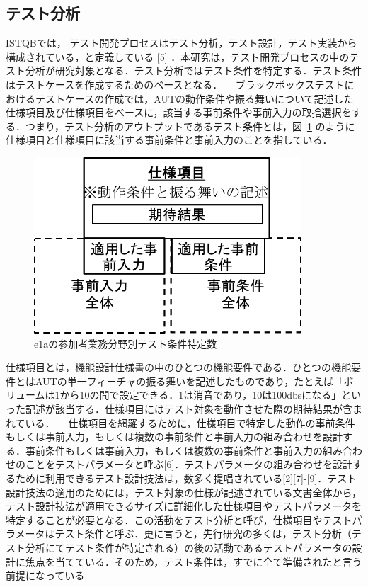 \documentclass[a4paper,12pt]{jreport}
\begin{document}
\subsection{テスト分析}
ISTQBでは， テスト開発プロセスはテスト分析，テスト設計，テスト実装から構成されている，と定義している [5] ．本研究は，テスト開発プロセスの中のテスト分析が研究対象となる．テスト分析ではテスト条件を特定する．テスト条件はテストケースを作成するためのベースとなる．
　ブラックボックステストにおけるテストケースの作成では，AUTの動作条件や振る舞いについて記述した仕様項目及び仕様項目をベースに，該当する事前条件や事前入力の取捨選択をする．つまり，テスト分析のアウトプットであるテスト条件とは，図~\ref{fig:D-4-Fig1} のように仕様項目と仕様項目に該当する事前条件と事前入力のことを指している．
\begin{figure}[h]
  \begin{center}
  \includegraphics[width=10cm]{./image/D-4-Fig1.png}
  \caption{e1aの参加者業務分野別テスト条件特定数}
  \label{fig:D-4-Fig1}
  \end{center}
   \end{figure}

仕様項目とは，機能設計仕様書の中のひとつの機能要件である．ひとつの機能要件とはAUTの単一フィーチャの振る舞いを記述したものであり，たとえば「ボリュームは1から10の間で設定できる．1は消音であり，10は100dbsになる」といった記述が該当する．仕様項目にはテスト対象を動作させた際の期待結果が含まれている．
　仕様項目を網羅するために，仕様項目で特定した動作の事前条件もしくは事前入力，もしくは複数の事前条件と事前入力の組み合わせを設計する．事前条件もしくは事前入力，もしくは複数の事前条件と事前入力の組み合わせのことをテストパラメータと呼ぶ[6]．テストパラメータの組み合わせを設計するために利用できるテスト設計技法は，数多く提唱されている[2][7]-[9]．テスト設計技法の適用のためには，テスト対象の仕様が記述されている文書全体から，テスト設計技法が適用できるサイズに詳細化した仕様項目やテストパラメータを特定することが必要となる．この活動をテスト分析と呼び，仕様項目やテストパラメータはテスト条件と呼ぶ．更に言うと，先行研究の多くは，テスト分析（テスト分析にてテスト条件が特定される）の後の活動であるテストパラメータの設計に焦点を当てている．そのため，テスト条件は，すでに全て準備されたと言う前提になっている
\end{document}
